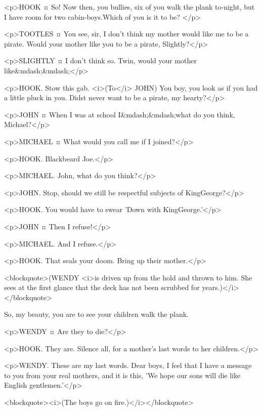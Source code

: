 <p>HOOK ¤
So! Now then, you bullies, six of you walk the plank to-night, but I have room for two cabin-boys.Which of you is it to be?
</p>

<p>TOOTLES ¤
You see, sir, I don't think my mother would like me to be a pirate. Would your mother like you to be a pirate, Slightly?</p>

<p>SLIGHTLY ¤
I don't think so. Twin, would your mother like&mdash;&mdash;</p>

<p>HOOK. Stow this gab. <i>(To</i> JOHN) You boy, you look as if you had a little pluck in you. Didst never want to be a pirate, my hearty?</p>

<p>JOHN ¤
When I was at school I&mdash;&mdash;what do you think, Michael?</p>

<p>MICHAEL ¤
What would you call me if I joined?</p>

<p>HOOK. Blackbeard Joe.</p>

<p>MICHAEL. John, what do you think?</p>

<p>JOHN. Stop, should we still be respectful subjects of KingGeorge?</p>

<p>HOOK. You would have to swear 'Down with KingGeorge.'</p>

<p>JOHN ¤
Then I refuse!</p>

<p>MICHAEL. And I refuse.</p>

<p>HOOK. That seals your doom. Bring up their mother.</p>

<blockquote>(WENDY <i>is driven up from the hold and thrown to him. She sees at the first glance that the deck has not been scrubbed for years.)</i></blockquote>

So, my beauty, you are to see your children walk the plank. 

<p>WENDY ¤
Are they to die?</p>

<p>HOOK. They are. Silence all, for a mother's last words to her children.</p>

<p>WENDY. These are my last words. Dear boys, I feel that I have a message to you from your real mothers, and it is this, 'We hope our sons will die like English gentlemen.'</p>

<blockquote><i>(The boys go on fire.)</i></blockquote>

